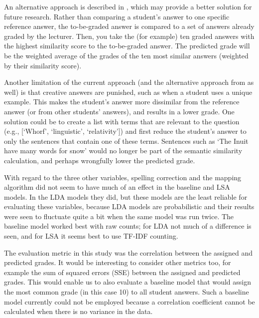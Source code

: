 \documentclass[a4paper,10pt,twoside]{article}
\begin{document}
An alternative approach is described in \cite{foltz1998}, which may provide a better solution for future research. Rather than comparing a student's answer to one specific reference answer, the to-be-graded answer is compared to a set of answers already graded by the lecturer. Then, you take the (for example) ten graded answers with the highest similarity score to the to-be-graded answer. The predicted grade will be the weighted average of the grades of the ten most similar answers (weighted by their similarity score).

Another limitation of the current approach (and the alternative approach from \cite{foltz1998} as well) is that creative answers are punished, such as when a student uses a unique example. This makes the student’s answer more dissimilar from the reference answer (or from other students’ answers), and results in a lower grade. One solution could be to create a list with terms that are relevant to the question (e.g., [`Whorf', `linguistic', `relativity']) and first reduce the student’s answer to only the sentences that contain one of these terms. Sentences such as ‘The Inuit have many words for snow’ would no longer be part of the semantic similarity calculation, and perhaps wrongfully lower the predicted grade.

With regard to the three other variables, spelling correction and the mapping algorithm did not seem to have much of an effect in the baseline and LSA models. In the LDA models they did, but these models are the least reliable for evaluating these variables, because LDA models are probabilistic and their results were seen to fluctuate quite a bit when the same model was run twice. The baseline model worked best with raw counts; for LDA not much of a difference is seen, and for LSA it seems best to use TF-IDF counting.

The evaluation metric in this study was the correlation between the assigned and predicted grades. It would be interesting to consider other metrics too, for example the sum of squared errors (SSE) between the assigned and predicted grades. This would enable us to also evaluate a baseline model that would assign the most common grade (in this case 10) to all student answers. Such a baseline model currently could not be employed because a correlation coefficient cannot be calculated when there is no variance in the data.
\end{document}
